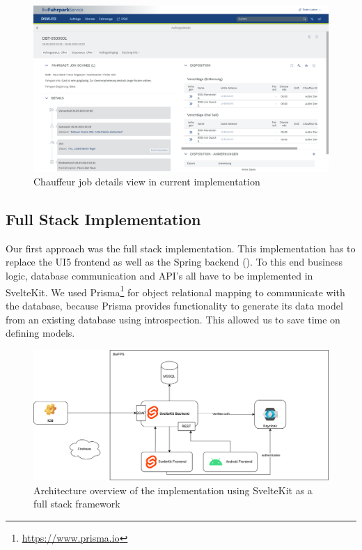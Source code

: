 \begin{figure}
    \centering
    \includegraphics[width=\linewidth]{assets/current-auftrag-details}
    \caption{Chauffeur job details view in current implementation}
    \label{fig:current-details-auftrag}
\end{figure}


\subsection{Full Stack Implementation}

Our first approach was the full stack implementation. This implementation has to replace the UI5 frontend as well as the Spring backend (). To this end business logic, database communication and API's all have to be implemented in SvelteKit. We used Prisma\footnote{\url{https://www.prisma.io}} for object relational mapping to communicate with the database, because Prisma provides functionality to generate its data model from an existing database using introspection. This allowed us to save time on defining models.


\begin{figure}
    \centering
    \includegraphics[width=.8\linewidth]{assets/dswfd-architecture-fullstack}
    \caption{Architecture overview of the implementation using SvelteKit as a full stack framework}
    \label{fig:dswfd-architecture-fullstack}
\end{figure}

